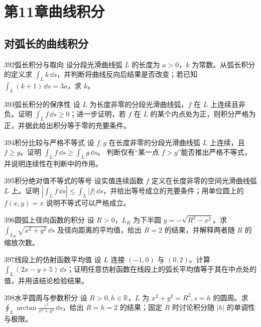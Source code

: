 \section{第11章\quad 曲线积分}
\subsection{对弧长的曲线积分}

\begin{exercise}{392}{弧长积分与取向}
设分段光滑曲线弧 $L$ 的长度为 $a>0$，$k$ 为常数。从弧长积分的定义求 $\int_Lk\,\dd s$，并判断将曲线反向后结果是否改变；若已知 $\int_L(k+1)\,\dd s=3a$，求 $k$。
\end{exercise}

\begin{exercise}{393}{弧长积分的保序性}
设 $L$ 为长度非零的分段光滑曲线弧，$f$ 在 $L$ 上连续且非负。证明 $\int_Lf\,\dd s\geq0$；进一步证明，若 $f$ 在 $L$ 的某个内点处为正，则积分严格为正，并据此给出积分等于零的充要条件。
\end{exercise}

\begin{exercise}{394}{积分比较与严格不等式}
设 $f,g$ 在长度非零的分段光滑曲线弧 $L$ 上连续，且 $f\geq g$。证明
$\int_Lf\,\dd s\geq\int_Lg\,\dd s$。
判断仅有“某一点 $f>g$”能否推出严格不等式，并说明连续性在判断中的作用。
\end{exercise}

\begin{exercise}{395}{积分绝对值不等式的等号}
设实值连续函数 $f$ 定义在长度非零的空间光滑曲线弧 $L$ 上。证明
$|\int_Lf\,\dd s|\leq\int_L|f|\,\dd s$，并给出等号成立的充要条件；用单位圆上的 $f(x,y)=x$ 说明不等式可以严格成立。
\end{exercise}

\begin{exercise}{396}{圆弧上径向函数的积分}
设 $R>0$，$L_R$ 为下半圆 $y=-\sqrt{R^2-x^2}$。求 $\int_{L_R}\sqrt{x^2+y^2}\,\dd s$ 及径向距离的平均值，给出 $R=2$ 的结果，并解释两者随 $R$ 的缩放次数。
\end{exercise}

\begin{exercise}{397}{线段上的仿射函数平均值}
设 $L$ 连接 $(-1,0)$ 与 $(0,2)$。计算 $\int_L(2x-y+5)\,\dd s$；证明任意仿射函数在线段上的弧长平均值等于其在中点处的值，并用该结论检验结果。
\end{exercise}

\begin{exercise}{398}{水平圆周与参数积分}
设 $R>0,h\in\mathbb R$，$L$ 为 $x^2+y^2=R^2,z=h$ 的圆周。求 $\oint_L\arctan\frac{z^2}{x^2+y^2}\,\dd s$，给出 $R=h=2$ 的结果；固定 $R$ 时讨论积分随 $|h|$ 的单调性与极限。
\end{exercise}

